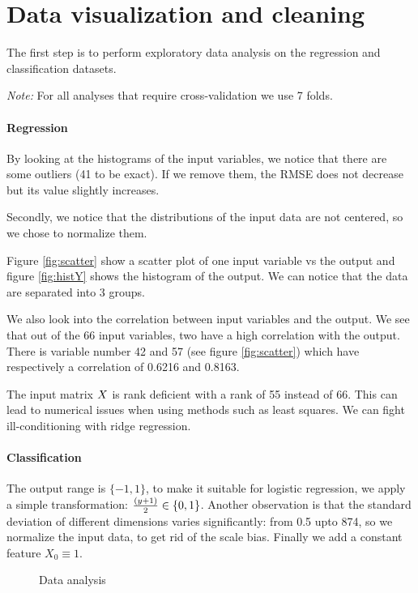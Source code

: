 \documentclass{article} %
\begin{document}
\section{Data visualization and cleaning}

The first step is to perform exploratory data analysis on the regression and classification datasets.

\emph{Note:} For all analyses that require cross-validation we use 7 folds. 

\paragraph{Regression} 
By looking at the histograms of the input variables, we notice that there are some outliers (41 to be exact). 
If we remove them, the RMSE does not decrease but its value slightly increases.

Secondly, we notice that the distributions of the input data are not centered, so we chose to normalize them.

Figure \ref{fig:scatter} show a scatter plot of one input variable vs the output and figure \ref{fig:histY} shows the histogram of the output.
We can notice that the data are separated into 3 groups. 

We also look into the correlation between input variables and the output. We see that out of the 66 input variables, two have a high correlation with the output. There is variable number 42 and 57 (see figure \ref{fig:scatter}) which have respectively a correlation of 0.6216 and 0.8163.

The input matrix $\boldmath{X}$ is rank deficient with a rank of 55 instead of 66. This can lead to numerical issues when using methods such as least squares.
We can fight ill-conditioning with ridge regression. 

\paragraph{Classification}
The output range is $\{-1, 1\}$, to make it suitable for logistic regression, we apply a simple transformation: ${(y + 1)\over 2} \in \{0, 1\}$. Another observation is that the standard deviation of different dimensions varies significantly: from 0.5 upto 874, so we normalize the input data, to get rid of the scale bias. Finally we add a constant feature $X_0 \equiv 1$.

\begin{figure}[!t]
	\centering
	\caption{Data analysis}
\end{figure}
\end{document}
